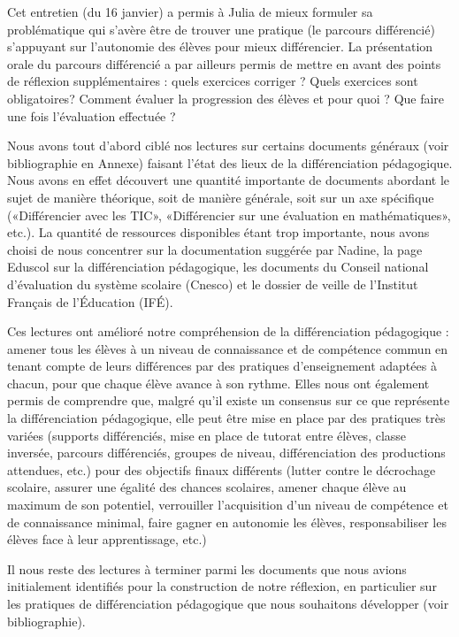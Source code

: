Cet entretien (du 16 janvier) a permis à Julia de mieux formuler sa problématique qui s’avère être de trouver une pratique (le parcours différencié) s’appuyant sur l’autonomie des élèves pour mieux différencier. La présentation orale du parcours différencié a par ailleurs permis de mettre en avant des points de réflexion supplémentaires : quels exercices corriger ? Quels exercices sont obligatoires? Comment évaluer la progression des élèves et pour quoi ? Que faire une fois l’évaluation effectuée ?

Nous avons tout d’abord ciblé nos lectures sur certains documents généraux (voir bibliographie en Annexe) faisant l’état des lieux de la différenciation pédagogique. Nous avons en effet découvert une quantité importante de documents abordant le sujet de manière théorique, soit de manière générale, soit sur un axe spécifique («Différencier avec les TIC», «Différencier sur une évaluation en mathématiques», etc.). La quantité de ressources disponibles étant trop importante, nous avons choisi de nous concentrer sur la documentation suggérée par Nadine, la page Eduscol sur la différenciation pédagogique, les documents du Conseil national d’évaluation du système scolaire (Cnesco) et le dossier de veille de l’Institut Français de l’Éducation (IFÉ).

Ces lectures ont amélioré notre compréhension de la différenciation pédagogique : amener tous les élèves à un niveau de connaissance et de compétence commun en tenant compte de leurs différences par des pratiques d’enseignement adaptées à chacun, pour que chaque élève avance à son rythme. Elles nous ont également permis de comprendre que, malgré qu’il existe un consensus sur ce que représente la différenciation pédagogique, elle peut être mise en place par des pratiques très variées (supports différenciés, mise en place de tutorat entre élèves, classe inversée, parcours différenciés, groupes de niveau, différenciation des productions attendues, etc.) pour des objectifs finaux différents (lutter contre le décrochage scolaire, assurer une égalité des chances scolaires, amener chaque élève au maximum de son potentiel, verrouiller l’acquisition d’un niveau de compétence et de connaissance minimal, faire gagner en autonomie les élèves, responsabiliser les élèves face à leur apprentissage, etc.) 

Il nous reste des lectures à terminer parmi les documents que nous avions initialement identifiés pour la construction de notre réflexion, en particulier sur les pratiques de différenciation pédagogique que nous souhaitons développer (voir bibliographie). 

